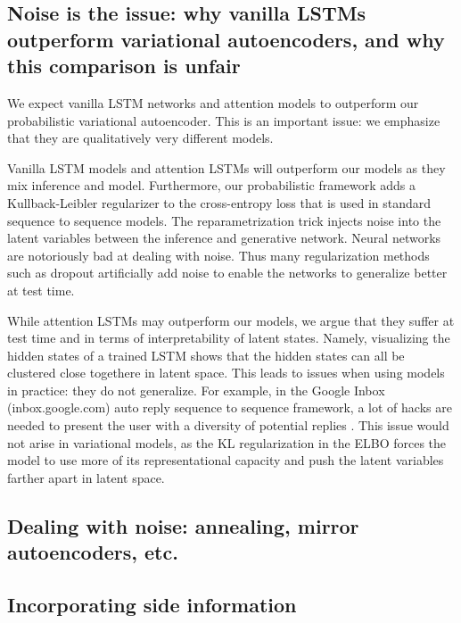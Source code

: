 \subsection*{Noise is the issue: why vanilla LSTMs outperform variational autoencoders, and why this comparison is unfair}

We expect vanilla LSTM networks and attention models to outperform our probabilistic variational autoencoder. This is an important issue:  we emphasize that they are qualitatively very different models.

Vanilla LSTM models and attention LSTMs will outperform our models as they mix inference and model. Furthermore, our probabilistic framework adds a Kullback-Leibler regularizer to the cross-entropy loss that is used in standard sequence to sequence models. The reparametrization trick \citep{Kingma2014} injects noise into the latent variables between the inference and generative network. Neural networks are notoriously bad at dealing with noise. Thus many regularization methods such as dropout \citep{Hinton2014} artificially add noise to enable the networks to generalize better at test time.

While attention LSTMs may outperform our models, we argue that they suffer at test time and in terms of interpretability of latent states. Namely, visualizing the hidden states of a trained LSTM shows that the hidden states can all be clustered close togethere in latent space. This leads to issues when using models in practice: they do not generalize. For example, in the Google Inbox (inbox.google.com) auto reply sequence to sequence framework, a lot of hacks are needed to present the user with a diversity of potential replies \citep{Corrado}. This issue would not arise in variational models, as the KL regularization in the ELBO forces the model to use more of its representational capacity and push the latent variables farther apart in latent space.

\subsection*{Dealing with noise: annealing, mirror autoencoders, etc.}

\subsection*{Incorporating side information}






